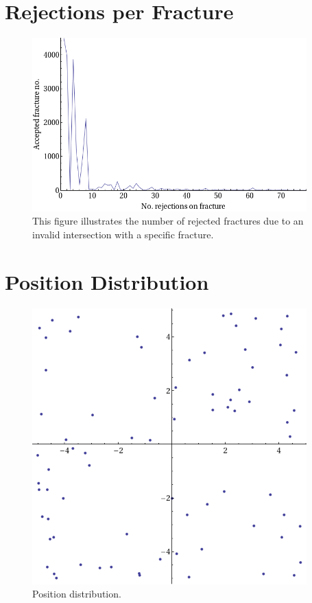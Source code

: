 \documentclass[a4paper,11pt]{article}
\begin{document}


\section{Rejections per Fracture}
\begin{figure}[H]
  \centering
  \includegraphics[width=300pt]{graphRejCaused.png}  \caption[Rejection per Fracture]{This figure illustrates the number of rejected fractures due to an invalid intersection with a specific fracture.}
\end{figure}

\section{Position Distribution}
\begin{figure}[H]
   \centering
    \includegraphics[width=300pt]{graphPositionDistribution.png} \caption{Position distribution.}
\end{figure}
\end{document}
